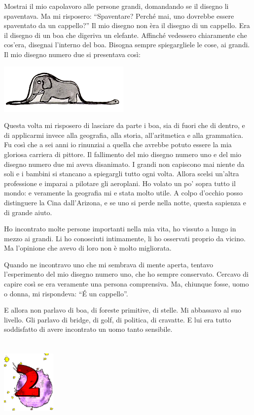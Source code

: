 \documentclass[11pt]{scrbook}
\begin{document}
Mostrai il mio capolavoro alle persone grandi, domandando se il disegno
li spaventava. Ma mi risposero: ``Spaventare? Perché mai, uno dovrebbe
essere spaventato da un cappello?'' Il mio disegno non èra il disegno di
un cappello. Era il disegno di un boa che digeriva un elefante. Affinché
vedessero chiaramente che cos'era, disegnai l'interno del boa. Bisogna
sempre spiegargliele le cose, ai grandi. Il mio disegno numero due si
presentava così:

\begin{center}
\includegraphics{img/boa}
\end{center}

Questa volta mi risposero di lasciare da parte i boa, sia di fuori che di dentro, e di applicarmi invece alla geografia, alla storia, all'aritmetica e alla grammatica. Fu così che a sei anni io rinunziai a quella che avrebbe potuto essere la mia gloriosa carriera di pittore. Il fallimento del mio disegno numero uno e del mio disegno numero due mi aveva disanimato. I grandi non capiscono mai niente da soli e i bambini si stancano a spiegargli tutto ogni volta. Allora scelsi un'altra professione e imparai a pilotare gli aeroplani. Ho volato un po' sopra tutto il mondo: e veramente la geografia mi e stata molto utile. A colpo d'occhio posso distinguere la Cina dall'Arizona, e se uno si perde nella notte, questa sapienza e di grande aiuto.

Ho incontrato molte persone importanti nella mia vita, ho vissuto a lungo in mezzo ai grandi. Li ho conosciuti intimamente, li ho osservati proprio da vicino. Ma l'opinione che avevo di loro non è molto migliorata.

Quando ne incontravo uno che mi sembrava di mente aperta, tentavo l'esperimento del mio disegno numero uno, che ho sempre conservato. Cercavo di capire così se era veramente una persona comprensiva. Ma, chiunque fosse, uomo o donna, mi rispondeva: ``É un cappello''.

E allora non parlavo di boa, di foreste primitive, di stelle. Mi abbassavo al suo livello. Gli parlavo di bridge, di golf, di politica, di cravatte. E lui era tutto soddisfatto di avere incontrato un uomo tanto sensibile.

\chapter{}
\begin{center}
\includegraphics{img/chapter2}
\end{center}
\end{document}
